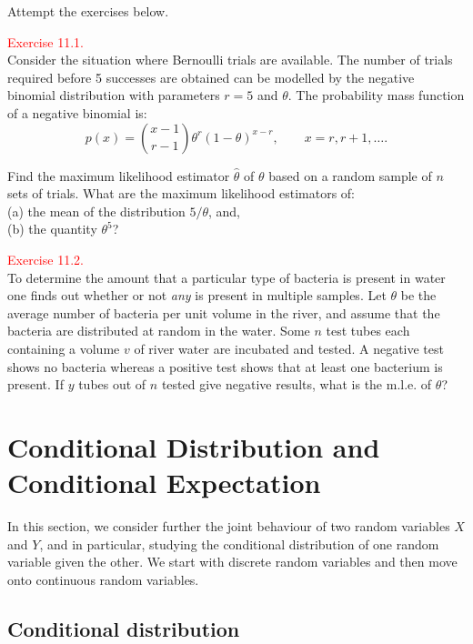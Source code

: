 \documentclass[
]{book}
\begin{document}
Attempt the exercises below.

\hypertarget{exer11:1}{}
\textcolor{red}{Exercise 11.1.}\\
Consider the situation where Bernoulli trials are available. The number of trials required before 5 successes are obtained can be modelled by the negative binomial distribution with parameters \(r=5\) and \(\theta\). The probability mass function of a negative binomial is:\\

\[ p(x) = {{x-1} \choose {r-1}} \theta^r (1 - \theta)^{x-r}, \qquad x = r, r+1, \dots. \]

Find the maximum likelihood estimator \(\hat{\theta}\) of \(\theta\) based on a random sample of \(n\) sets of trials. What are the maximum likelihood estimators of:\\
(a) the mean of the distribution \(5/\theta\), and,\\
(b) the quantity \(\theta^5\)?

\hfill\break

\leavevmode{}%
\textcolor{red}{Exercise 11.2.}\\
To determine the amount that a particular type of bacteria is present in water one finds out whether or not \emph{any} is present in multiple samples. Let \(\theta\) be the average number of bacteria per unit volume in the river, and assume that the bacteria are distributed at random in the water. Some \(n\) test tubes each containing a volume \(v\) of river water are incubated and tested. A negative test shows no bacteria whereas a positive test shows that at least one bacterium is present. If \(y\) tubes out of \(n\) tested give negative results, what is
the m.l.e. of \(\theta\)?

\hypertarget{CondDis}{%
\chapter{Conditional Distribution and Conditional Expectation}\label{CondDis}}

In this section, we consider further the joint behaviour of two random variables \(X\) and \(Y\), and in particular, studying the conditional distribution of one random variable given the other. We start with discrete random variables and then move onto continuous random variables.

\hypertarget{CondDis:CondDis}{%
\section{Conditional distribution}\label{CondDis:CondDis}}
\end{document}
